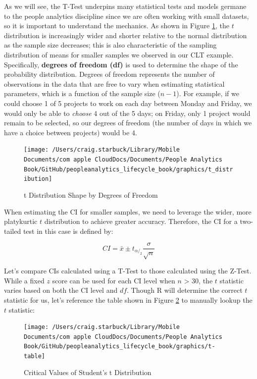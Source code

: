 \documentclass[]{book}
\begin{document}
As we will see, the T-Test underpins many statistical tests and models germane to the people analytics discipline since we are often working with small datasets, so it is important to understand the mechanics. As shown in Figure \ref{fig:t-distribution}, the \(t\) distribution is increasingly wider and shorter relative to the normal distribution as the sample size decreases; this is also characteristic of the sampling distribution of means for smaller samples we observed in our CLT example. Specifically, \textbf{degrees of freedom (df)} is used to determine the shape of the probability distribution. Degrees of freedom represents the number of observations in the data that are free to vary when estimating statistical parameters, which is a function of the sample size (\(n - 1\)). For example, if we could choose 1 of 5 projects to work on each day between Monday and Friday, we would only be able to \emph{choose} 4 out of the 5 days; on Friday, only 1 project would remain to be selected, so our degrees of freedom (the number of days in which we have a choice between projects) would be 4.

\begin{figure}

{\centering \texttt{[image: /Users/craig.starbuck/Library/Mobile Documents/com~apple~CloudDocs/Documents/People Analytics Book/GitHub/peopleanalytics\_lifecycle\_book/graphics/t\_distribution]} 

}

\caption{t Distribution Shape by Degrees of Freedom}\label{fig:t-distribution}
\end{figure}

When estimating the CI for smaller samples, we need to leverage the wider, more platykurtic \(t\) distribution to achieve greater accuracy. Therefore, the CI for a two-tailed test in this case is defined by:

\[ CI = \bar{x} \pm t_{\alpha/_2} \frac{\sigma}{\sqrt{n}} \]

Let's compare CIs calculated using a T-Test to those calculated using the Z-Test. While a fixed \(z\) score can be used for each CI level when \(n\) \textgreater{} 30, the \(t\) statistic varies based on both the CI level and \(df\). Though R will determine the correct \(t\) statistic for us, let's reference the table shown in Figure \ref{fig:t-crit} to manually lookup the \(t\) statistic:

\begin{figure}

{\centering \texttt{[image: /Users/craig.starbuck/Library/Mobile Documents/com~apple~CloudDocs/Documents/People Analytics Book/GitHub/peopleanalytics\_lifecycle\_book/graphics/t-table]} 

}

\caption{Critical Values of Student's t Distribution}\label{fig:t-crit}
\end{figure}
\end{document}
